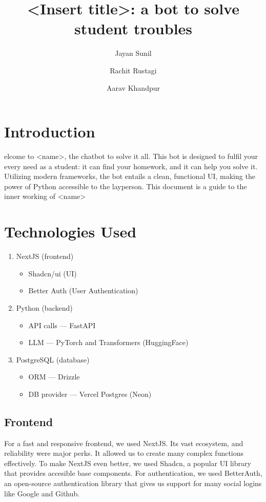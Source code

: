 \documentclass[9pt,a4paper,twocolumn,twoside]{tau-class/tau}
\title{<Insert title>: a bot to solve student troubles}
\author[a,1]{Jayan Sunil}
\author[b,2]{Rachit Rustagi}
\author[c,3]{Aarav Khandpur}
\affil[a]{IX --- Everest, +91 9910856655}
\affil[b]{IX --- Nilgiris, idk}
\affil[c]{IX --- Nilgiris, idk}
\begin{document}
\maketitle
\thispagestyle{firststyle}
\tauabstract
\tableofcontents
\linenumbers


\section{Introduction}

elcome to <name>, the chatbot to solve it all. This bot is designed to fulfil your every need as a student: it can find your homework, and it can help you solve it. Utilizing modern frameworks, the bot entails a clean, functional UI, making the power of Python accessible to the layperson. This document is a guide to the inner working of <name>


\section{Technologies Used}
\begin{enumerate}
	\item NextJS (frontend)
	      \begin{itemize}
		      \item Shadcn/ui (UI)
		      \item Better Auth (User Authentication)
	      \end{itemize}
	\item Python (backend)
	      \begin{itemize}
		      \item API calls --- FastAPI
		      \item LLM --- PyTorch and Transformers (HuggingFace)
	      \end{itemize}
	\item PostgreSQL (database)
	      \begin{itemize}
		      \item ORM --- Drizzle
		      \item DB provider --- Vercel Postgres (Neon)
	      \end{itemize}
\end{enumerate}
\subsection{Frontend}
For a fast and responsive frontend, we used NextJS. Its vast ecosystem, and reliability were major perks. It allowed us to create many complex functions effectively. To make NextJS even better, we used Shadcn, a popular UI library that provides accesible base components. For authentication, we used BetterAuth, an open-source authentication library that gives us support for many social logins like Google and Github.
\end{document}
